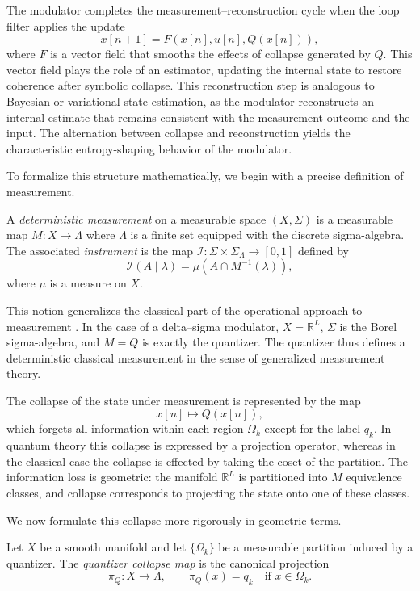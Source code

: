 The modulator completes the measurement--reconstruction cycle when the loop filter applies the update
\[
x[n+1] = F(x[n], u[n], Q(x[n])),
\]
where $F$ is a vector field that smooths the effects of collapse generated by $Q$. This vector field plays the role of an estimator, updating the internal state to restore coherence after symbolic collapse. This reconstruction step is analogous to Bayesian or variational state estimation, as the modulator reconstructs an internal estimate that remains consistent with the measurement outcome and the input. The alternation between collapse and reconstruction yields the characteristic entropy-shaping behavior of the modulator.

To formalize this structure mathematically, we begin with a precise definition of measurement.

\begin{definition}
A \emph{deterministic measurement} on a measurable space $(X,\Sigma)$ is a measurable map $M : X \to \Lambda$ where $\Lambda$ is a finite set equipped with the discrete sigma-algebra. The associated \emph{instrument} is the map $\mathcal{I} : \Sigma \times \Sigma_{\Lambda} \to [0,1]$ defined by
\[
\mathcal{I}(A \mid \lambda) = \mu(A \cap M^{-1}(\lambda)),
\]
where $\mu$ is a measure on $X$.
\end{definition}

This notion generalizes the classical part of the operational approach to measurement \cite{busch1996quantummeasurement}. In the case of a delta--sigma modulator, $X = \mathbb{R}^{L}$, $\Sigma$ is the Borel sigma-algebra, and $M = Q$ is exactly the quantizer. The quantizer thus defines a deterministic classical measurement in the sense of generalized measurement theory.

The collapse of the state under measurement is represented by the map
\[
x[n] \longmapsto Q(x[n]),
\]
which forgets all information within each region $\Omega_{k}$ except for the label $q_{k}$. In quantum theory this collapse is expressed by a projection operator, whereas in the classical case the collapse is effected by taking the coset of the partition. The information loss is geometric: the manifold $\mathbb{R}^L$ is partitioned into $M$ equivalence classes, and collapse corresponds to projecting the state onto one of these classes.

We now formulate this collapse more rigorously in geometric terms.

\begin{definition}
Let $X$ be a smooth manifold and let $\{\Omega_{k}\}$ be a measurable partition induced by a quantizer. The \emph{quantizer collapse map} is the canonical projection
\[
\pi_{Q} : X \to \Lambda,
\qquad
\pi_{Q}(x) = q_{k} \quad \text{if } x \in \Omega_{k}.
\]
\end{definition}


